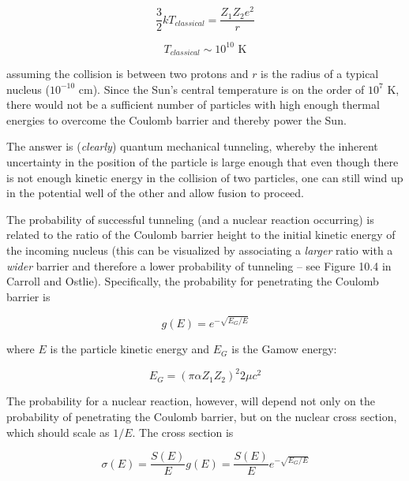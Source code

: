 \begin{equation}
\frac{3}{2} k T_{classical} = \frac{Z_{1} Z_{2} e^2}{r}
\end{equation}

\begin{equation}
T_{classical} \sim 10^{10} \text{  K}
\end{equation}

\noindent assuming the collision is between two protons and $r$ is the radius of a typical nucleus ($10^{-10}$ cm).  Since the Sun's central temperature is on the order of $10^7$ K, there would not be a sufficient number of particles with high enough thermal energies to overcome the Coulomb barrier and thereby power the Sun.

The answer is (\textit{clearly}) quantum mechanical tunneling, whereby the inherent uncertainty in the position of the particle is large enough that even though there is not enough kinetic energy in the collision of two particles, one can still wind up in the potential well of the other and allow fusion to proceed.

The probability of successful tunneling (and a nuclear reaction occurring) is related to the ratio of the Coulomb barrier height to the initial kinetic energy of the incoming nucleus (this can be visualized by associating a \textit{larger} ratio with a \textit{wider} barrier and therefore a lower probability of tunneling -- see Figure 10.4 in Carroll and Ostlie).  Specifically, the probability for penetrating the Coulomb barrier is 

\begin{equation}
g(E) = e^{-\sqrt{E_{G}/E}}
\end{equation}

\noindent where $E$ is the particle kinetic energy and $E_{G}$ is the Gamow energy:

\begin{equation}
E_{G} = \left(\pi \alpha Z_{1} Z_{2} \right)^2 2 \mu c^2
\end{equation}


The probability for a nuclear reaction, however, will depend not only on the probability of penetrating the Coulomb barrier, but on the nuclear cross section, which should scale as $1/E$.  The cross section is

\begin{equation}
\sigma(E) = \frac{S(E)}{E} g(E) =  \frac{S(E)}{E} e^{-\sqrt{E_{G}/E}}
\end{equation}

